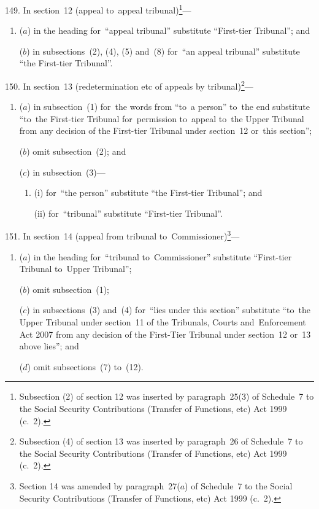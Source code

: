 \documentclass[12pt,a4paper]{article}
\begin{document}
149.  In section~12 (appeal to~appeal tribunal)\footnote{Subsection (2) of section 12 was inserted by paragraph~25(3) of Schedule~7 to the Social Security Contributions (Transfer of Functions, etc) Act 1999 (c.~2).}—
\begin{enumerate}\item[]
($a$) in the heading for~“appeal tribunal” substitute “First-tier Tribunal”; and

($b$) in subsections~(2), (4), (5) and~(8) for~“an appeal tribunal” substitute “the First-tier Tribunal”.
\end{enumerate}

\medskip

150.  In section~13 (redetermination etc of appeals by tribunal)\footnote{Subsection (4) of section 13 was inserted by paragraph~26 of Schedule~7 to the Social Security Contributions (Transfer of Functions, etc) Act 1999 (c.~2).}—
\begin{enumerate}\item[]
($a$) in subsection~(1) for~the words from “to~a person” to~the end substitute “to~the First-tier Tribunal for~permission to~appeal to~the Upper Tribunal from any decision of the First-tier Tribunal under section~12 or~this section”;

($b$) omit subsection~(2); and

($c$) in subsection~(3)—
\begin{enumerate}\item[]
(i) for~“the person” substitute “the First-tier Tribunal”; and

(ii) for~“tribunal” substitute “First-tier Tribunal”.
\end{enumerate}
\end{enumerate}

\medskip

151.  In section~14 (appeal from tribunal to~Commissioner)\footnote{Section 14 was amended by paragraph~27($a$) of Schedule~7 to the Social Security Contributions (Transfer of Functions, etc) Act 1999 (c.~2).}—
\begin{enumerate}\item[]
($a$) in the heading for~“tribunal to~Commissioner” substitute “First-tier Tribunal to~Upper Tribunal”;

($b$) omit subsection~(1);

($c$) in subsections~(3) and~(4) for~“lies under this section” substitute “to~the Upper Tribunal under section~11 of the Tribunals, Courts and~Enforcement Act 2007 from any decision of the First-Tier Tribunal under section~12 or~13 above lies”; and

($d$) omit subsections~(7) to~(12).
\end{enumerate}
\end{document}
